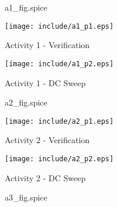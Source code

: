 

\begin{figure}
	\begin{framed}
		
	\end{framed}
	\caption{a1\_fig.spice}
\end{figure}

\begin{figure}[H]
	\centering
	\texttt{[image: include/a1\_p1.eps]}
	\caption{Activity 1 - Verification}
	\label{fig:a1-p1}
\end{figure}
\begin{framed}
	
\end{framed}

\begin{figure}[H]
	\centering
	\texttt{[image: include/a1\_p2.eps]}
	\caption{Activity 1 - DC Sweep}
	\label{fig:a1-p2}
\end{figure}
\begin{framed}
	
\end{framed}


\begin{figure}
	\begin{framed}
		
	\end{framed}
	\caption{a2\_fig.spice}
\end{figure}

\begin{figure}[H]
	\centering
	\texttt{[image: include/a2\_p1.eps]}
	\caption{Activity 2 - Verification}
	\label{fig:a2-p1}
\end{figure}
\begin{framed}
	
\end{framed}

\begin{figure}[H]
	\centering
	\texttt{[image: include/a2\_p2.eps]}
	\caption{Activity 2 - DC Sweep}
	\label{fig:a2-p2}
\end{figure}
\begin{framed}
	
\end{framed}


\begin{figure}
	\begin{framed}
		
	\end{framed}
	\caption{a3\_fig.spice}
\end{figure}

